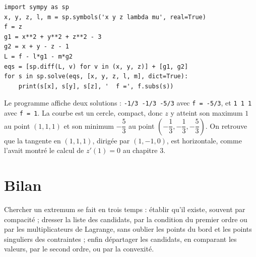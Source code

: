 \documentclass[a4paper,twoside]{report}
\begin{document}
\begin{lstlisting}
import sympy as sp
x, y, z, l, m = sp.symbols('x y z lambda mu', real=True)
f = z
g1 = x**2 + y**2 + z**2 - 3
g2 = x + y - z - 1
L = f - l*g1 - m*g2
eqs = [sp.diff(L, v) for v in (x, y, z)] + [g1, g2]
for s in sp.solve(eqs, [x, y, z, l, m], dict=True):
    print(s[x], s[y], s[z], '  f =', f.subs(s))
\end{lstlisting}

\noindent Le programme affiche deux solutions : \texttt{-1/3 -1/3 -5/3} avec \texttt{f = -5/3}, et \texttt{1 1 1} avec \texttt{f = 1}. La courbe est un cercle, compact, donc $z$ y atteint son maximum $1$ au point $(1, 1, 1)$ et son minimum $-\dfrac{5}{3}$ au point $\left(-\dfrac{1}{3}, -\dfrac{1}{3}, -\dfrac{5}{3}\right)$. On retrouve que la tangente en $(1, 1, 1)$, dirigée par $(1, -1, 0)$, est horizontale, comme l'avait montré le calcul de $z'(1) = 0$ au chapitre 3.
\section{Bilan}

Chercher un extremum se fait en trois temps : établir qu'il existe, souvent par compacité ; dresser la liste des candidats, par la condition du premier ordre ou par les multiplicateurs de Lagrange, sans oublier les points du bord et les points singuliers des contraintes ; enfin départager les candidats, en comparant les valeurs, par le second ordre, ou par la convexité.
\end{document}
